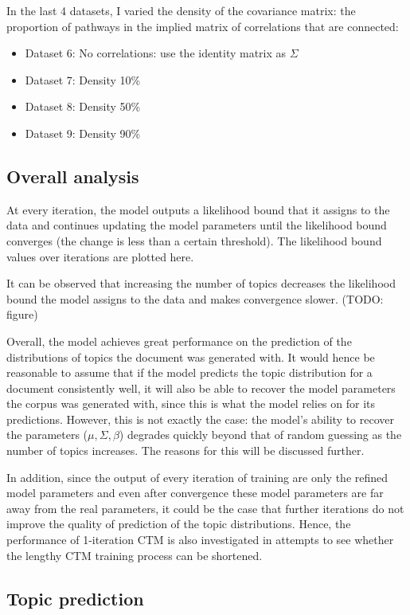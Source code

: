 \documentclass[12pt,a4paper,twoside,openright]{report}
\begin{document}
In the last 4 datasets, I varied the density of the covariance matrix: the proportion of pathways in the implied matrix of correlations that are connected:

\begin{itemize}[noitemsep]
\item Dataset 6: No correlations: use the identity matrix as $\Sigma$
\item Dataset 7: Density 10\%
\item Dataset 8: Density 50\%
\item Dataset 9: Density 90\%
\end{itemize}

\subsection{Overall analysis}

At every iteration, the model outputs a likelihood bound that it assigns to the data and continues updating the model parameters until the likelihood bound converges (the change is less than a certain threshold). The likelihood bound values over iterations are plotted here.

It can be observed that increasing the number of topics decreases the likelihood bound the model assigns to the data and makes convergence slower. (TODO: figure)

Overall, the model achieves great performance on the prediction of the distributions of topics the document was generated with. It would hence be reasonable to assume that if the model predicts the topic distribution for a document consistently well, it will also be able to recover the model parameters the corpus was generated with, since this is what the model relies on for its predictions. However, this is not exactly the case: the model's ability to recover the parameters ($\mu, \Sigma, \beta$) degrades quickly beyond that of random guessing as the number of topics increases. The reasons for this will be discussed further.

In addition, since the output of every iteration of training are only the refined model parameters and even after convergence these model parameters are far away from the real parameters, it could be the case that further iterations do not improve the quality of prediction of the topic distributions. Hence, the performance of 1-iteration CTM is also investigated in attempts to see whether the lengthy CTM training process can be shortened.

\subsection{Topic prediction}
\end{document}
